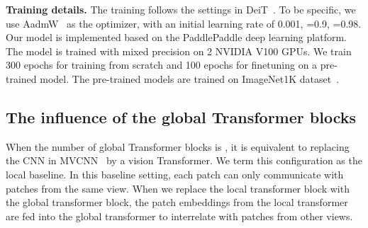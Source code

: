 \documentclass{bmvc2k}
\begin{document}
\noindent \textbf{Training details.}
The training follows the settings in DeiT~\cite{touvron2020training}. To be specific, we use AadmW~\cite{adamw} as the optimizer, with an initial learning rate of 0.001, =0.9, =0.98. Our model is implemented based on the PaddlePaddle deep learning platform. The model is trained with mixed precision on 2 NVIDIA V100 GPUs.  We train 300 epochs for training from scratch and 100 epochs for finetuning on a pre-trained model. The pre-trained models are trained on ImageNet1K dataset~\cite{deng2009imagenet}.

\subsection{The influence of the global Transformer blocks}
When the number of global Transformer blocks is , it is equivalent to replacing the CNN in MVCNN~\cite{su2015multi} by a vision Transformer. We term this configuration as the local baseline. In this baseline setting, each patch can only communicate with patches from the same view. When we replace the local transformer block with the global transformer block, the patch embeddings from the local transformer are fed into the global transformer to interrelate with patches from other views. 
\end{document}
